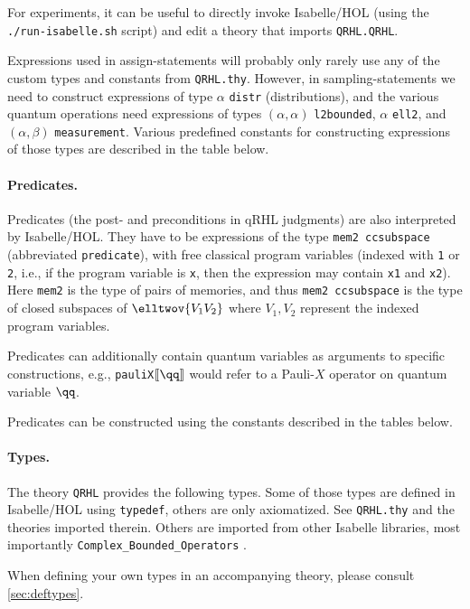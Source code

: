 \documentclass{article}
\begin{document}
For experiments, it can be useful to directly invoke Isabelle/HOL
(using the \texttt{./run-isabelle.sh} script) and edit a theory that
imports \texttt{QRHL.QRHL}.

Expressions used in assign-statements will probably only rarely use
any of the custom types and constants from \texttt{QRHL.thy}.
However, in sampling-statements we need to construct
expressions of type $\alpha$
\texttt{distr} (distributions), and the various quantum operations
need expressions of types $(\alpha,\alpha)$
\texttt{l2bounded}, $\alpha$
\texttt{ell2}, and $(\alpha,\beta)$
\texttt{measurement}. Various predefined constants for constructing
expressions of those types are described in the table below.


\paragraph{Predicates.} Predicates (the post- and preconditions in
qRHL judgments) are also interpreted by Isabelle/HOL. They have to be
expressions of the type \texttt{mem2 ccsubspace} (abbreviated \texttt{predicate}),
with free classical
program variables (indexed with \texttt{1} or \texttt{2}, i.e., if the
program variable is \texttt{x}, then the expression may contain
\texttt{x1} and \texttt{x2}). Here \texttt{mem2} is the type of pairs
of memories, and thus \texttt{mem2 ccsubspace} is the type of closed subspaces of
$\elltwov{V_1V_2}$
where $V_1,V_2$ represent the indexed program variables.

Predicates can additionally contain quantum variables as arguments to
specific constructions, e.g., \texttt{pauliX\guillemotright$\llbracket\qq\rrbracket$}
would refer to a Pauli-$X$ operator on quantum variable $\qq$.

Predicates can be constructed using the constants described in the
tables below.



\paragraph{Types.} The theory \texttt{QRHL} provides the following
types. Some of those types are defined in Isabelle/HOL using
\texttt{typedef}, others are only axiomatized.
See \texttt{QRHL.thy} and the theories imported therein.
Others are imported from other Isabelle libraries, most importantly \texttt{Complex\_Bounded\_Operators} \cite{bounded-operators}.

When defining your own types in an accompanying theory, please consult \autoref{sec:deftypes}.
\end{document}
